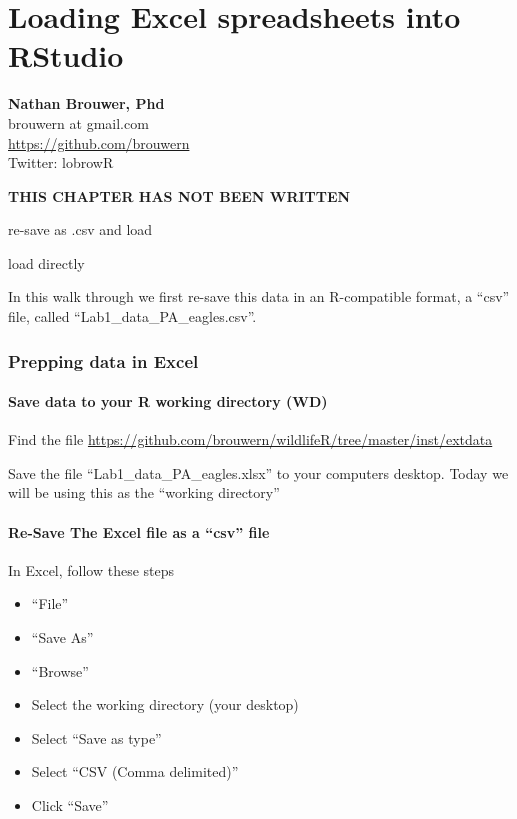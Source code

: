 \documentclass[]{book}
\providecommand{\tightlist}{%
  \setlength{\itemsep}{0pt}\setlength{\parskip}{0pt}}
\theoremstyle{definition}
\theoremstyle{definition}
\theoremstyle{definition}
\theoremstyle{remark}
\begin{document}
\chapter{Loading Excel spreadsheets into
RStudio}\label{loading-excel-spreadsheets-into-rstudio}

\textbf{Nathan Brouwer, Phd}\\
brouwern at gmail.com\\
\url{https://github.com/brouwern}\\
Twitter: lobrowR

\textbf{THIS CHAPTER HAS NOT BEEN WRITTEN}

re-save as .csv and load

load directly

In this walk through we first re-save this data in an R-compatible
format, a ``csv'' file, called ``Lab1\_data\_PA\_eagles.csv''.

\subsection{Prepping data in Excel}\label{prepping-data-in-excel}

\subsubsection{Save data to your R working directory
(WD)}\label{save-data-to-your-r-working-directory-wd}

Find the file
\url{https://github.com/brouwern/wildlifeR/tree/master/inst/extdata}

Save the file ``Lab1\_data\_PA\_eagles.xlsx'' to your computers desktop.
Today we will be using this as the ``working directory''

\subsubsection{\texorpdfstring{Re-Save The Excel file as a ``csv''
file}{Re-Save The Excel file as a csv file}}\label{re-save-the-excel-file-as-a-csv-file}

In Excel, follow these steps

\begin{itemize}
\tightlist
\item
  ``File''
\item
  ``Save As''
\item
  ``Browse''
\item
  Select the working directory (your desktop)
\item
  Select ``Save as type''
\item
  Select ``CSV (Comma delimited)''
\item
  Click ``Save''
\end{itemize}
\end{document}
